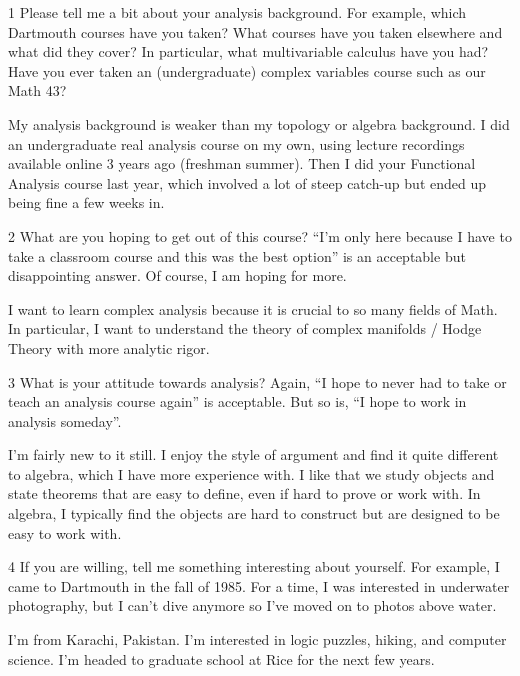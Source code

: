\documentclass[12pt]{article}
\begin{document}


\begin{problem}{1}
Please tell me a bit about your analysis background. For example, which Dartmouth courses have you taken? What courses have you taken elsewhere and what did they cover? In particular, what multivariable calculus have you had? Have you ever taken an (undergraduate) complex variables course such as our Math 43?
\end{problem}
\begin{solution}
    My analysis background is weaker than my topology or algebra background. I did an undergraduate real analysis course on my own, using lecture recordings available online  3 years ago (freshman summer). Then I did your Functional Analysis course last year, which involved a lot of steep catch-up but ended up being fine a few weeks in. 
\end{solution}

\begin{problem}{2}
What are you hoping to get out of this course? ``I’m only here because I have to take a classroom course and this was the best option'' is an acceptable but disappointing answer. Of course, I am hoping for more.
\end{problem}
\begin{solution}
    I want to learn complex analysis because it is crucial to so many fields of Math. In particular, I want to understand the theory of complex manifolds / Hodge Theory with more analytic rigor.
\end{solution}


\begin{problem}{3}
What is your attitude towards analysis? Again, ``I hope to never had to take or teach an analysis course again'' is acceptable. But so is, ``I hope to work in analysis someday''.
\end{problem}
\begin{solution}
    I'm fairly new to it still. I enjoy the style of argument and find it quite different to algebra, which I have more experience with. I like that we study objects and state theorems that are easy to define, even if hard to prove or work with. In algebra, I typically find the objects are hard to construct but are designed to be easy to work with. 
\end{solution}


\begin{problem}{4}
If you are willing, tell me something interesting about yourself. For example, I came to Dartmouth in the fall of 1985. For a time, I was interested in underwater photography, but I can’t dive anymore so I’ve moved on to photos above water.
\end{problem}
\begin{solution}
    I'm from Karachi, Pakistan. I'm interested in logic puzzles, hiking, and computer science. I'm headed to graduate school at Rice for the next few years. 
\end{solution}
\end{document}
